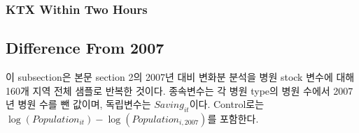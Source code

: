 \documentclass[a4paper, 10pt]{article}
\begin{document}
                \begin{table}[H]
                    \centering
                    \caption{All-Region Per-Capita Hospital Regression, Travel-Time Saving: 상급종합병원}
                    
                \end{table}

            \subsubsection{KTX Within Two Hours}
                \begin{table}[H]
                    \centering
                    \caption{All-Region Per-Capita Hospital Regression, KTX Within Two Hours: 의원}
                    
                \end{table}

                \begin{table}[H]
                    \centering
                    \caption{All-Region Per-Capita Hospital Regression, KTX Within Two Hours: 병원}
                    
                \end{table}

                \begin{table}[H]
                    \centering
                    \caption{All-Region Per-Capita Hospital Regression, KTX Within Two Hours: 종합병원}
                    
                \end{table}

                \begin{table}[H]
                    \centering
                    \caption{All-Region Per-Capita Hospital Regression, KTX Within Two Hours: 상급종합병원}
                    
                \end{table}

        \subsection{Difference From 2007}
            이 subsection은 본문 section 2의 2007년 대비 변화분 분석을 병원 stock 변수에 대해
            160개 지역 전체 샘플로 반복한 것이다. 종속변수는 각 병원 type의 병원 수에서
            2007년 병원 수를 뺀 값이며, 독립변수는 $Saving_{it}$이다. Control로는
            $\log(Population_{it}) - \log(Population_{i,2007})$를 포함한다.
\end{document}
